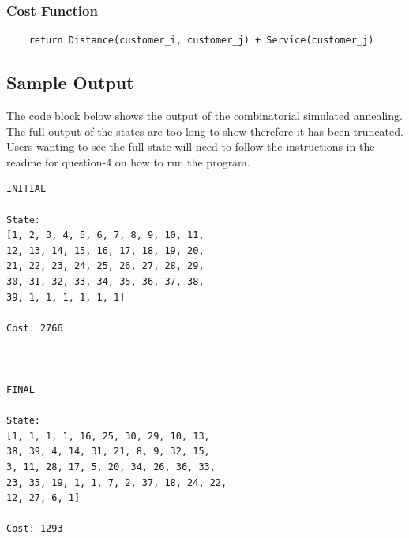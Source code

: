 \documentclass{article}
\begin{document}
\subsubsection{Cost Function}

\begin{lstlisting}
    return Distance(customer_i, customer_j) + Service(customer_j)
\end{lstlisting}

\subsection{Sample Output}
The code block below shows the output of the combinatorial simulated annealing. The full output of the states are too long to show therefore it has been truncated. Users wanting to see the full state will need to follow the instructions in the readme for question-4 on how to run the program.

\begin{lstlisting}
INITIAL

State:
[1, 2, 3, 4, 5, 6, 7, 8, 9, 10, 11,
12, 13, 14, 15, 16, 17, 18, 19, 20,
21, 22, 23, 24, 25, 26, 27, 28, 29,
30, 31, 32, 33, 34, 35, 36, 37, 38,
39, 1, 1, 1, 1, 1, 1]

Cost: 2766


        
FINAL

State:
[1, 1, 1, 1, 16, 25, 30, 29, 10, 13,
38, 39, 4, 14, 31, 21, 8, 9, 32, 15,
3, 11, 28, 17, 5, 20, 34, 26, 36, 33,
23, 35, 19, 1, 1, 7, 2, 37, 18, 24, 22,
12, 27, 6, 1]

Cost: 1293
\end{lstlisting}
\end{document}
